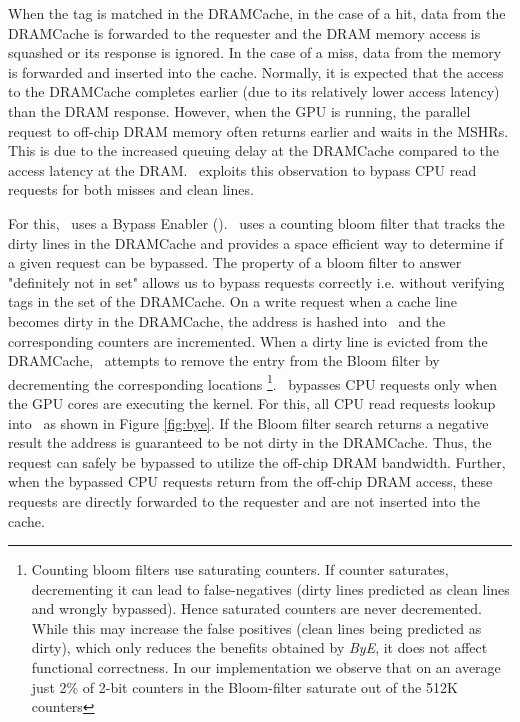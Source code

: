 When the tag is matched in the DRAMCache, in the case of a hit, data from the DRAMCache is forwarded to the requester and the DRAM memory access is squashed or its response is ignored. In the case of a miss, data from the memory is forwarded and inserted into the cache. Normally, it is expected that the access to the DRAMCache completes earlier (due to its relatively lower access latency) than the DRAM response. However, when the GPU is running, the parallel request to off-chip DRAM memory often returns earlier and waits in the MSHRs. This is due to the increased queuing delay at the DRAMCache compared to the access latency at the DRAM. \cachename\ exploits this observation to bypass CPU read requests for both misses and clean lines.
\par For this, \cachename\ uses a Bypass Enabler (\bypassname). \bypassname\ uses a counting bloom filter \cite{bloom,counting-bloom} that tracks the dirty lines in the DRAMCache and provides a space efficient way to determine if a given request can be bypassed. The property of a bloom filter to answer "definitely not in set" allows us to bypass requests correctly i.e. without verifying tags in the set of the DRAMCache. 
On a write request when a cache line becomes dirty in the DRAMCache, the address is hashed into \bypassname\ and the corresponding counters are incremented. When a dirty line is evicted from the DRAMCache, \bypassname\ attempts to remove the entry from the Bloom filter by decrementing the corresponding locations \footnote{Counting bloom filters use saturating counters. If counter saturates, decrementing it can lead to false-negatives (dirty lines predicted as clean lines and wrongly bypassed). Hence saturated counters are never decremented.  While this may increase the false positives (clean lines being predicted as dirty), which only reduces the benefits obtained by \textit{ByE}, it does not affect functional correctness. In our implementation we observe that on an average just 2\% of 2-bit counters in the Bloom-filter saturate out of the 512K counters}.
\bypassname\ bypasses CPU requests only when the GPU cores are executing the kernel. For this, all CPU read requests lookup into \bypassname\ as shown in Figure \ref{fig:bye}. If the Bloom filter search returns a  negative result the address is guaranteed to be not dirty in the DRAMCache. Thus, the request can safely be bypassed to utilize the off-chip DRAM bandwidth. 
Further, when the bypassed CPU requests return from the off-chip DRAM access, these requests are directly forwarded to the requester and are not inserted into the cache. 
